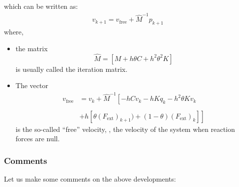 which can be written as:
\begin{eqnarray}
  \label{eq:24}
   v_{k+1} = v_{\mathrm{free}}  + \widehat{M}^{-1} p_{k+1}
\end{eqnarray}
where,
\begin{itemize}
\item the matrix
  \begin{equation}
\widehat{M} = \left[M+h\theta C + h^2 \theta^2 K \right]  \label{eq:2002}
\end{equation}
is usually called the iteration matrix.
\item The vector
\begin{equation}
 \label{eq:2003}
\begin{array}{ll}
v_{\mathrm{free}}  & = v_{k} + \widehat{M}^{-1} \left[   - h  C v_{k} - h K q_{k} - h^2 \theta  K v_{k} \right. \\ \\
& \left. +  h\left[ \theta  (F_{\mathrm{ext}})_{k+1})+(1-\theta)  (F_{\mathrm{ext}})_{k} \right] \right]
\end{array}
\end{equation}
%
is the so-called ``free'' velocity, \ie{}, the velocity of the system when reaction forces are null.
\end{itemize}


\subsubsection{Comments}

Let us make some  comments on the above developments:

